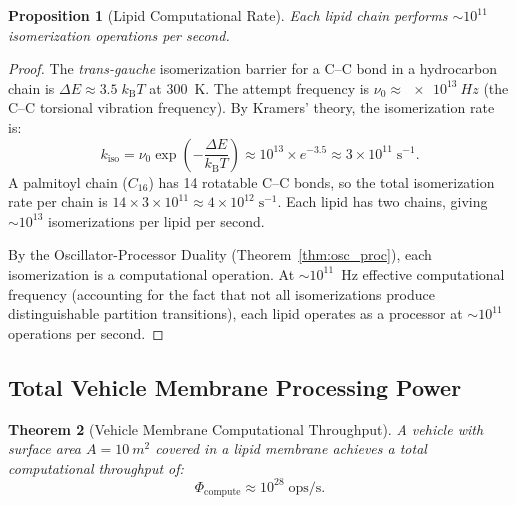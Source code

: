 \documentclass[twocolumn,10pt]{article}
\newtheorem{theorem}{Theorem}[section]
\newtheorem{proposition}[theorem]{Proposition}
\theoremstyle{definition}
\theoremstyle{remark}
\newcommand{\kB}{k_{\mathrm{B}}}
\begin{document}
\begin{proposition}[Lipid Computational Rate]
\label{prop:lipid_rate}
Each lipid chain performs $\sim 10^{11}$ isomerization operations per second.
\end{proposition}

\begin{proof}
The \emph{trans-gauche} isomerization barrier for a C--C bond in a hydrocarbon chain is $\Delta E \approx 3.5\;\kB T$ at \SI{300}{K}. The attempt frequency is $\nu_0 \approx \SI{e13}{Hz}$ (the C--C torsional vibration frequency). By Kramers' theory, the isomerization rate is:
\begin{equation}
  k_{\mathrm{iso}} = \nu_0 \exp\!\left(-\frac{\Delta E}{\kB T}\right) \approx 10^{13} \times e^{-3.5} \approx 3 \times 10^{11}\;\mathrm{s}^{-1}.
  \label{eq:iso_rate}
\end{equation}
A palmitoyl chain ($C_{16}$) has 14 rotatable C--C bonds, so the total isomerization rate per chain is $14 \times 3 \times 10^{11} \approx 4 \times 10^{12}\;\mathrm{s}^{-1}$. Each lipid has two chains, giving $\sim 10^{13}$ isomerizations per lipid per second.

By the Oscillator-Processor Duality (Theorem~\ref{thm:osc_proc}), each isomerization is a computational operation. At $\sim 10^{11}$~Hz effective computational frequency (accounting for the fact that not all isomerizations produce distinguishable partition transitions), each lipid operates as a processor at $\sim 10^{11}$ operations per second.
\end{proof}

\subsection{Total Vehicle Membrane Processing Power}

\begin{theorem}[Vehicle Membrane Computational Throughput]
\label{thm:vehicle_throughput}
A vehicle with surface area $A = \SI{10}{m^2}$ covered in a lipid membrane achieves a total computational throughput of:
\begin{equation}
  \Phi_{\mathrm{compute}} \approx 10^{28}\;\mathrm{ops/s}.
  \label{eq:vehicle_throughput}
\end{equation}
\end{theorem}
\end{document}
